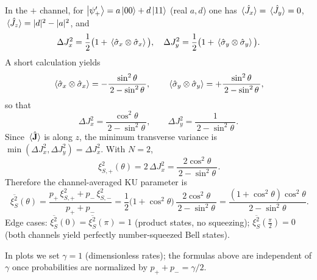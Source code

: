 \documentclass[12pt,a4paper]{article}
\begin{document}
In the \(+\) channel, for \(\ket{\psi_+'}=a\ket{00}+d\ket{11}\) (real \(a,d\)) one has
\(\expval*{\hat J_x}=\expval*{\hat J_y}=0\), \(\expval*{\hat J_z}=|d|^2-|a|^2\), and
\[
\Delta J_x^2=\frac{1}{2}\big(1+\expval*{\hat\sigma_x\otimes \hat\sigma_x}\big),\quad
\Delta J_y^2=\frac{1}{2}\big(1+\expval*{\hat\sigma_y\otimes \hat\sigma_y}\big).
\]
A short calculation yields
\[
\expval*{\hat\sigma_x\otimes \hat\sigma_x}=-\frac{\sin^2\theta}{\,2-\sin^2\theta\,},\qquad
\expval*{\hat\sigma_y\otimes \hat\sigma_y}=+\frac{\sin^2\theta}{\,2-\sin^2\theta\,},
\]
so that
\[
\Delta J_x^2=\frac{\cos^2\theta}{\,2-\sin^2\theta\,},\qquad
\Delta J_y^2=\frac{1}{\,2-\sin^2\theta\,}.
\]
Since \(\expval*{\hat{\mathbf J}}\) is along \(z\), the minimum transverse variance is \(\min(\Delta J_x^2,\Delta J_y^2)=\Delta J_x^2\).
With \(N=2\),
\[
\boxed{\,\xi_{S,+}^2(\theta)=2\,\Delta J_x^2
	=\frac{2\cos^2\theta}{\,2-\sin^2\theta\,}.}
\]
Therefore the channel-averaged KU parameter is
\[
\boxed{\;
	\overline{\xi_S^2}(\theta)
	=\frac{p_+\,\xi_{S,+}^2+p_-\,\xi_{S,-}^2}{p_++p_-}
	=\frac{1}{2}\big(1+\cos^2\theta\big)\,\frac{2\cos^2\theta}{\,2-\sin^2\theta\,}
	=\frac{(1+\cos^2\theta)\cos^2\theta}{\,2-\sin^2\theta\,}.}
\]
Edge cases: \(\overline{\xi_S^2}(0)=\overline{\xi_S^2}(\pi)=1\) (product states, no squeezing);
\(\overline{\xi_S^2}(\tfrac{\pi}{2})=0\) (both channels yield perfectly number-squeezed Bell states).

\medskip
In plots we set \(\gamma=1\) (dimensionless rates); the formulas above are independent of \(\gamma\) once probabilities are normalized by \(p_+{+}p_-=\gamma/2\).

	
\end{document}
